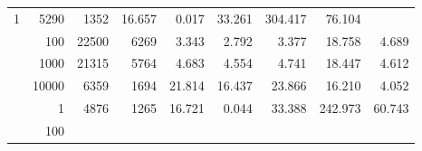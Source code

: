 \begin{table}
\begin{tabular}{rrrrrrrrr}
					
					 
					\multirow{ 1 }{*}{ 1 } &
					
						
							    
							     5290  & 1352  
	                           & 16.657 & 0.017 & 33.261
	                           & 304.417 & 76.104  \\
	                
	            
					 &  
					 
					\multirow{ 1 }{*}{ 100 } &
					
						
							    
							     22500  & 6269  
	                           & 3.343 & 2.792 & 3.377
	                           & 18.758 & 4.689  \\
	                
	            
					 &  
					 
					\multirow{ 1 }{*}{ 1000 } &
					
						
							    
							     21315  & 5764  
	                           & 4.683 & 4.554 & 4.741
	                           & 18.447 & 4.612  \\
	                
	            
					 &  
					 
					\multirow{ 1 }{*}{ 10000 } &
					
						
							    
							     6359  & 1694  
	                           & 21.814 & 16.437 & 23.866
	                           & 16.210 & 4.052  \\
	                
	            
	        
				\noalign{\smallskip}\hline
				\multirow{ 4 }{*}{ 2000000 } &
				
					
					 
					\multirow{ 1 }{*}{ 1 } &
					
						
							    
							     4876  & 1265  
	                           & 16.721 & 0.044 & 33.388
	                           & 242.973 & 60.743  \\
	                
	            
					 &  
					 
					\multirow{ 1 }{*}{ 100 } &
					
						
							    

\end{tabular}
\end{table}
